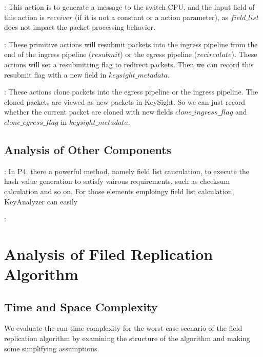 : This action is to generate a message to the switch CPU, and the input field of this action is $receiver$ (if it is not a constant or a action parameter), as $field\_list$ does not impact the packet processing behavior.

 : These primitive actions will resubmit packets into the ingress pipeline from the end of the ingress pipeline ($resubmit$) or the egress pipeline ($recirculate$). These actions will set a resubmitting flag to redirect packets. Then we can record this resubmit flag with a new field in $keysight\_metadata$.

 : These actions clone packets into the egress pipeline or the ingress pipeline. The cloned packets are viewed as new packets in KeySight. So we can just record whether the current packet are cloned with new fields $clone\_ingress\_flag$ and $clone\_egress\_flag$ in $keysight\_metadata$.

\subsection{Analysis of Other Components}


: In P4, there a powerful method, namely field list cauculation,  to execute the hash value generation to satisfy vairous requirements, such as checksum calculation and so on. For those elements emploingy  field list calculation, KeyAnalyzer can easily 

: 

\section{Analysis of Filed Replication Algorithm}





\subsection{Time and Space Complexity}
We evaluate the run-time complexity for the worst-case scenario of the field replication algorithm by examining the structure of the algorithm and making some simplifying assumptions.


